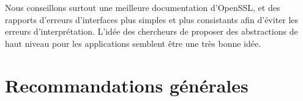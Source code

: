 Nous conseillons surtout une meilleure documentation d'OpenSSL, et des rapports d'erreurs d'interfaces plus simples et plus consistants afin d'éviter les erreurs d'interprétation. L'idée des chercheurs de proposer des abstractions de haut niveau pour les applications semblent être une très bonne idée.


\section{Recommandations générales}
